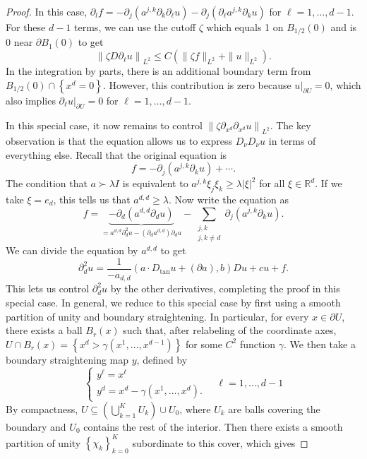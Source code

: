 \begin{proof}
In this case, $\partial_l f=-\partial_{j}\left(a^{j, k} \partial_{k} \partial_{\ell} u\right)-\partial_{j}\left(\partial_{\ell} a^{j, k} \partial_{k} u\right)$ for $\ell=1, \ldots, d-1$. For these $d-1$ terms, we can use the cutoff $\zeta$ which equals 1 on $B_{1 / 2}(0)$ and is 0 near $\partial B_{1}(0)$ to get
$$
\left\|\zeta D \partial_{\ell} u\right\|_{L^{2}} \leq C\left(\|\zeta f\|_{L^{2}}+\|u\|_{L^{2}}\right) .
$$
In the integration by parts, there is an additional boundary term from $B_{1 / 2}(0) \cap\left\{x^{d}=0\right\}$. However, this contribution is zero because $\left.u\right|_{\partial U}=0$, which also implies $\left.\partial_{\ell} u\right|_{\partial U}=0$ for $\ell=1, \ldots, d-1$.

In this special case, it now remains to control $\left\|\zeta \partial_{x^{d}} \partial_{x^{d}} u\right\|_{L^{2}}$. The key observation is that the equation allows us to express $D_{\nu} D_{\nu} u$ in terms of everything else. Recall that the original equation is
$$
f=-\partial_{j}\left(a^{j, k} \partial_{k} u\right)+\cdots .
$$
The condition that $a \succ \lambda I$ is equivalent to $a^{j, k} \xi_{j} \xi_{k} \geq \lambda|\xi|^{2}$ for all $\xi \in \mathbb{R}^{d}$. If we take $\xi=e_{d}$, this tells us that $a^{d, d} \geq \lambda$. Now write the equation as
$$
f=\underbrace{-\partial_{d}\left(a^{d, d} \partial_{d} u\right)}_{=a^{d, d} \partial_{d}^{2} u-\left(\partial_{d} a^{d, d}\right) \partial_{d} u}-\sum_{\substack{j, k \\ j, k \neq d}} \partial_{j}\left(a^{j, k} \partial_{k} u\right) .
$$
We can divide the equation by $a^{d, d}$ to get
$$
\partial_{d}^{2} u=\frac{1}{-a_{d, d}}\left(a \cdot D_{\tan } u+(\partial a), b\right) D u+c u+f .
$$
This lets us control $\partial_{d}^{2} u$ by the other derivatives, completing the proof in this special case.
In general, we reduce to this special case by first using a smooth partition of unity and boundary straightening. In particular, for every $x \in \partial U$, there exists a ball $B_{r}(x)$ such that, after relabeling of the coordinate axes, $U \cap B_{r}(x)=\left\{x^{d}>\gamma\left(x^{1}, \ldots, x^{d-1}\right)\right\}$ for some $C^{2}$ function $\gamma$. We then take a boundary straightening map $y$, defined by
$$
\left\{\begin{array}{l}
y^{\ell}=x^{\ell} \\
y^{d}=x^{d}-\gamma\left(x^{1}, \ldots, x^{d}\right) .
\end{array} \quad \ell=1, \ldots, d-1\right.
$$
By compactness, $U \subseteq\left(\bigcup_{k=1}^{K} U_{k}\right) \cup U_{0}$, where $U_{k}$ are balls covering the boundary and $U_{0}$ contains the rest of the interior. Then there exists a smooth partition of unity $\left\{\chi_{k}\right\}_{k=0}^{K}$ subordinate to this cover, which gives

\end{proof}
